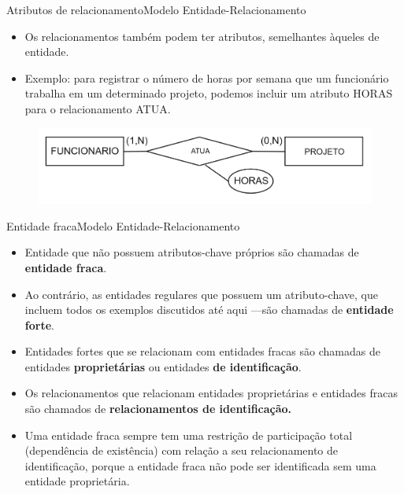 \documentclass[t]{beamer}
\begin{document}

\begin{ftst}{Atributos de relacionamento}{Modelo Entidade-Relacionamento}
\begin{itemize}
    \item Os relacionamentos também podem ter atributos, semelhantes àqueles de entidade.
    \item Exemplo: para registrar o número de horas por semana que um funcionário trabalha em um determinado projeto, podemos incluir um atributo HORAS para o relacionamento ATUA.
\end{itemize}
\vone
\begin{figure}
    \centering
    \includegraphics[scale=0.2]{Figuras/01_22.png}
\end{figure}


\end{ftst}


\begin{ftst}{Entidade fraca}{Modelo Entidade-Relacionamento}
\small
\begin{itemize}
    \item Entidade que não possuem atributos-chave próprios são chamadas de \textbf{entidade fraca}.
    \item Ao contrário, as entidades regulares que possuem um atributo-chave, que incluem todos os exemplos discutidos até aqui —são chamadas de \textbf{entidade forte}.
    \item Entidades fortes que se relacionam com entidades fracas são chamadas de entidades \textbf{proprietárias} ou entidades \textbf{de identificação}.
    \item Os relacionamentos que relacionam entidades proprietárias e entidades fracas são chamados de \textbf{relacionamentos de identificação.}
    \item Uma entidade fraca sempre tem uma restrição de participação total (dependência de existência) com relação a seu relacionamento de identificação, porque a entidade fraca não pode ser identificada sem uma entidade proprietária.
\end{itemize}
\end{ftst}
\end{document}
